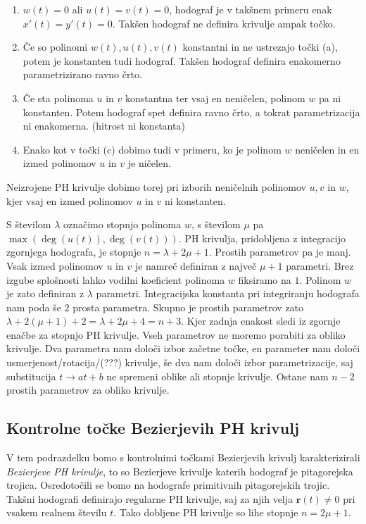 \documentclass[isrm2, tisk]{fmfdelo}
\begin{document}
    \begin{enumerate}
        \itemsep0em
        \item $w(t)=0$ ali $u(t)=v(t)=0$, hodograf je v takšnem primeru enak $x'(t)=y'(t)=0$.
        Takšen hodograf ne definira krivulje ampak točko.
        \item  Če so polinomi $w(t),u(t),v(t)$ konstantni in ne ustrezajo točki (a), potem je konstanten tudi hodograf.
        Takšen hodograf definira enakomerno parametrizirano ravno črto.
        \item  Če sta polinoma $u$ in $v$ konstantna ter vsaj en neničelen, polinom $w$ pa ni konstanten.
        Potem hodograf spet definira ravno črto, a tokrat parametrizacija ni enakomerna. (hitrost ni konstanta)
        \item Enako kot v točki (c) dobimo tudi v primeru, ko je polinom $w$ neničelen in en izmed polinomov $u$ in $v$ je ničelen.
    \end{enumerate}
    \vspace{-0.3cm}
    \noindent Neizrojene PH krivulje dobimo torej pri izborih neničelnih polinomov $u,v$ in $w$, kjer vsaj en izmed polinomov $u$ in $v$ ni konstanten.

    S številom $\lambda$ označimo stopnjo polinoma $w$, s številom $\mu$ pa $\max(\deg(u(t)),\deg(v(t)))$.
    PH krivulja, pridobljena z integracijo zgornjega hodografa, je stopnje $n=\lambda + 2\mu + 1$.
    Prostih parametrov pa je manj.
    Vsak izmed polinomov $u$ in $v$ je namreč definiran z največ $\mu + 1$ parametri.
    Brez izgube splošnosti lahko vodilni koeficient polinoma $w$ fiksiramo na $1$.
    Polinom $w$ je zato definiran z $\lambda$ parametri.
    Integracijska konstanta pri integriranju hodografa nam poda še $2$ prosta parametra.
    Skupno je prostih parametrov zato $\lambda + 2(\mu+1)+2=\lambda + 2\mu+4 = n+3$.
    Kjer zadnja enakost sledi iz zgornje enačbe za stopnjo PH krivulje.
    Vseh parametrov ne moremo porabiti za obliko krivulje.
    Dva parametra nam določi izbor začetne točke, en parameter nam določi usmerjenost/rotacija/(???) krivulje, še dva nam določi izbor parametrizacije, saj substitucija $t\to at+b$ ne spremeni oblike ali stopnje krivulje.
    Ostane nam $n-2$ prostih parametrov za obliko krivulje.

    \subsection{Kontrolne točke Bezierjevih PH krivulj}
    V tem podrazdelku bomo s kontrolnimi točkami Bezierjevih krivulj karakterizirali \textit{Bezierjeve PH krivulje}, to so Bezierjeve krivulje katerih hodograf je pitagorejska trojica.
    Osredotočili se bomo na hodografe primitivnih pitagorejskih trojic.
    Takšni hodografi definirajo regularne PH krivulje, saj za njih velja $\mathbf{r}(t) \neq 0$ pri vsakem realnem številu $t$.
    Tako dobljene PH krivulje so lihe stopnje $n=2\mu+1$.
\end{document}
